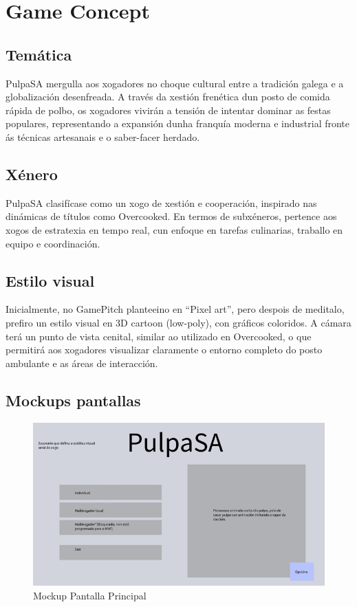 \documentclass{report}  %
\begin{document}
\section{Game Concept}

\subsection{Temática}
PulpaSA mergulla aos xogadores no choque cultural entre a tradición galega e a globalización desenfreada. A través da xestión frenética dun posto de comida rápida de polbo, os xogadores vivirán a tensión de intentar dominar as festas populares, representando a expansión dunha franquía moderna e industrial fronte ás técnicas artesanais e o saber-facer herdado. 

\subsection{Xénero}
PulpaSA clasifícase como un xogo de xestión e cooperación, inspirado nas 
dinámicas de títulos como Overcooked. En termos de subxéneros, pertence 
aos xogos de estratexia en tempo real, cun enfoque en tarefas culinarias, 
traballo en equipo e coordinación. 

\subsection{Estilo visual}
Inicialmente, no GamePitch planteeino en “Pixel art”, pero despois de meditalo, 
prefiro un estilo visual en 3D cartoon (low-poly), con gráficos coloridos. A cámara terá un 
punto de vista cenital, similar ao utilizado en Overcooked, o que permitirá aos 
xogadores visualizar claramente o entorno completo do posto ambulante e as 
áreas de interacción. 

\subsection{Mockups pantallas}
\begin{figure}[h]
    \centering
    \includegraphics[width=1\textwidth]{images/mockup1.png}
    \caption{Mockup Pantalla Principal}
    \label{fig:Mockup Pantalla Principal}
\end{figure}
\end{document}

